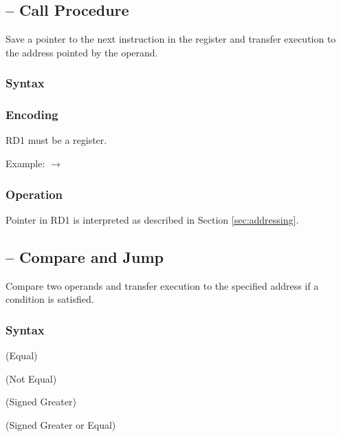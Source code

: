 \documentclass[a4paper,12pt,twoside,extrafontsizes]{memoir}
\begin{document}
{\subsection{ -- Call Procedure}
\label{subsec:instr:call}

Save a pointer to the next instruction in the  register and transfer execution to the address pointed by the operand.

\subsubsection{Syntax}


\subsubsection{Encoding}


RD1 must be a register.

Example:  $\rightarrow$ 

\subsubsection{Operation}



Pointer in RD1 is interpreted as described in Section \ref{sec:addressing}.

\subsection{ -- Compare and Jump}
\label{subsec:instr:cjmpxxx}

Compare two operands and transfer execution to the specified address if a condition is satisfied.

\subsubsection{Syntax}

 (Equal)

 (Not Equal)

 (Signed Greater)

 (Signed Greater or Equal)

}
\end{document}
